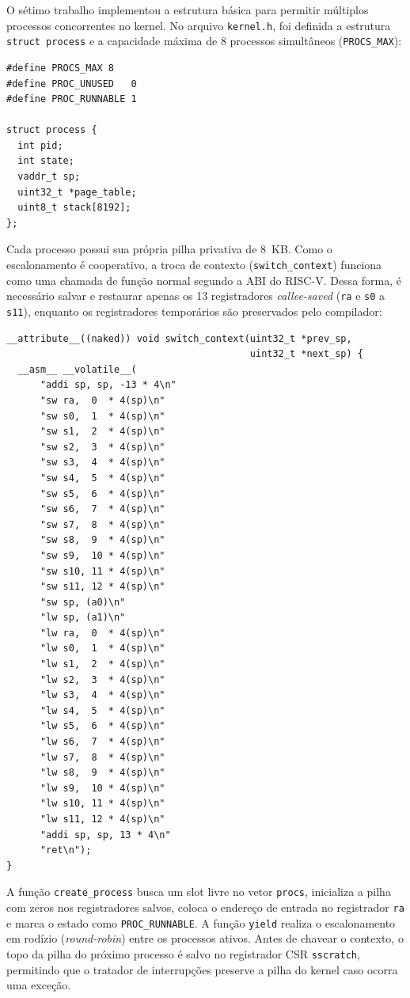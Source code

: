 \documentclass[12pt]{article}
\begin{document}
O sétimo trabalho implementou a estrutura básica para permitir múltiplos processos concorrentes no kernel. No arquivo \texttt{kernel.h}, foi definida a estrutura \texttt{struct process} e a capacidade máxima de 8 processos simultâneos (\texttt{PROCS\_MAX}):

\begin{verbatim}
#define PROCS_MAX 8
#define PROC_UNUSED   0
#define PROC_RUNNABLE 1

struct process {
  int pid;
  int state;
  vaddr_t sp;
  uint32_t *page_table;
  uint8_t stack[8192];
};
\end{verbatim}

Cada processo possui sua própria pilha privativa de 8~KB. Como o escalonamento é cooperativo, a troca de contexto (\texttt{switch\_context}) funciona como uma chamada de função normal segundo a ABI do RISC-V. Dessa forma, é necessário salvar e restaurar apenas os 13 registradores \textit{callee-saved} (\texttt{ra} e \texttt{s0} a \texttt{s11}), enquanto os registradores temporários são preservados pelo compilador:

\begin{verbatim}
__attribute__((naked)) void switch_context(uint32_t *prev_sp,
                                           uint32_t *next_sp) {
  __asm__ __volatile__(
      "addi sp, sp, -13 * 4\n"
      "sw ra,  0  * 4(sp)\n"
      "sw s0,  1  * 4(sp)\n"
      "sw s1,  2  * 4(sp)\n"
      "sw s2,  3  * 4(sp)\n"
      "sw s3,  4  * 4(sp)\n"
      "sw s4,  5  * 4(sp)\n"
      "sw s5,  6  * 4(sp)\n"
      "sw s6,  7  * 4(sp)\n"
      "sw s7,  8  * 4(sp)\n"
      "sw s8,  9  * 4(sp)\n"
      "sw s9,  10 * 4(sp)\n"
      "sw s10, 11 * 4(sp)\n"
      "sw s11, 12 * 4(sp)\n"
      "sw sp, (a0)\n"
      "lw sp, (a1)\n"
      "lw ra,  0  * 4(sp)\n"
      "lw s0,  1  * 4(sp)\n"
      "lw s1,  2  * 4(sp)\n"
      "lw s2,  3  * 4(sp)\n"
      "lw s3,  4  * 4(sp)\n"
      "lw s4,  5  * 4(sp)\n"
      "lw s5,  6  * 4(sp)\n"
      "lw s6,  7  * 4(sp)\n"
      "lw s7,  8  * 4(sp)\n"
      "lw s8,  9  * 4(sp)\n"
      "lw s9,  10 * 4(sp)\n"
      "lw s10, 11 * 4(sp)\n"
      "lw s11, 12 * 4(sp)\n"
      "addi sp, sp, 13 * 4\n"
      "ret\n");
}
\end{verbatim}

A função \texttt{create\_process} busca um slot livre no vetor \texttt{procs}, inicializa a pilha com zeros nos registradores salvos, coloca o endereço de entrada no registrador \texttt{ra} e marca o estado como \texttt{PROC\_RUNNABLE}. A função \texttt{yield} realiza o escalonamento em rodízio (\textit{round-robin}) entre os processos ativos. Antes de chavear o contexto, o topo da pilha do próximo processo é salvo no registrador CSR \texttt{sscratch}, permitindo que o tratador de interrupções preserve a pilha do kernel caso ocorra uma exceção.
\end{document}
